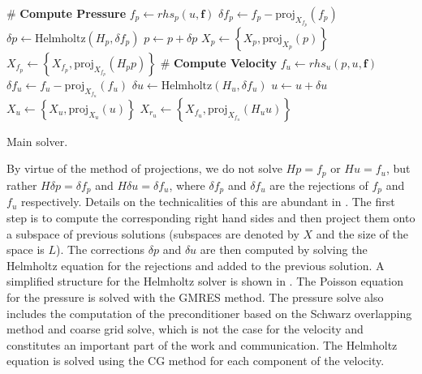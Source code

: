 \documentclass{sig-alternate}
\begin{document}
\begin{algorithm}
\begin{algorithmic}
\State \# \textbf{Compute Pressure}
\State $f_p \leftarrow rhs_p(u, \mathbf{f})$ %
\State $\delta f_p \leftarrow f_p - \text{proj}_{X_{f_p}}(f_p)$ %
\State $\delta p \leftarrow \text{Helmholtz}(H_p,\delta f_p)$ %
\State $p \leftarrow p + \delta p$ %
\State $X_p \leftarrow \left\{ X_p, \text{proj}_{X_{p}}(p) \right\}$ %
\State $X_{f_p} \leftarrow \left\{ X_{f_p}, \text{proj}_{X_{f_p}}(H_p p) \right\}$ %
\State \# \textbf{Compute Velocity}
\State $f_{u} \leftarrow rhs_{u}(p, u, \mathbf{f})$ %
\State $\delta f_{u} \leftarrow f_{u} - \text{proj}_{X_{f_{u}}}(f_{u})$ %
\State $\delta {u} \leftarrow \text{Helmholtz}(H_{u},\delta f_{u})$ %
\State ${u} \leftarrow u + \delta u$ %
\State $X_{u} \leftarrow \left\{ X_{u}, \text{proj}_{X_{u}}(u) \right\}$ %
\State $X_{r_{u}} \leftarrow \left\{ X_{f_{u}}, \text{proj}_{X_{f_u}}(H_{u} u) \right\}$ %
\EndFor
\EndProcedure
\end{algorithmic}
\caption{Main solver.}
\label{alg:code_struct}
\end{algorithm}

By virtue of the method of projections, we do not solve $Hp=f_p$ or $Hu=f_u$, but 
rather $H\delta p=\delta f_p$ and $H\delta u=\delta f_u$, where $\delta f_p$ and 
$\delta f_u$ are the rejections of $f_p$ and $f_u$ respectively. Details on the 
technicalities of this are abundant in \cite{Fischer1998}. The first step is to 
compute the corresponding right hand sides and then project them onto a subspace 
of previous solutions (subspaces are denoted by $X$ and the size of the space is $L$).
 The corrections $\delta p$ and $\delta u$ are then computed by solving the Helmholtz 
equation for the rejections and added to the previous solution. A simplified structure 
for the Helmholtz solver is shown in . The Poisson equation for
the pressure is solved with the GMRES method. The pressure solve also includes the
computation of the preconditioner based on the Schwarz overlapping method and 
coarse grid solve, which is not the case for the velocity and constitutes an 
important part of the work and communication. The Helmholtz equation is solved using the CG method for each component of the velocity.
\end{document}
